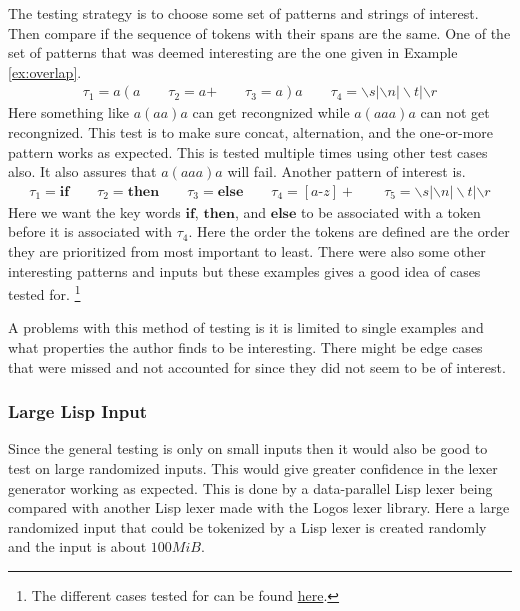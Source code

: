 \documentclass[a4paper,12pt]{article}
\theoremstyle{definition}
\begin{document}
The testing strategy is to choose some set of patterns and strings of interest. Then compare if the sequence of tokens with their spans are the same. One of the set of patterns that was deemed interesting are the one given in Example \ref{ex:overlap}.
\begin{align*}
  \tau_1 = a(a \qquad \tau_2 = a\text{+} \qquad \tau_3 = a)a \qquad \tau_4 = \backslash s|\backslash n |\backslash t | \backslash r
\end{align*}
Here something like $a(aa)a$ can get recongnized while $a(aaa)a$ can not get recongnized. This test is to make sure concat, alternation, and the one-or-more pattern works as expected. This is tested multiple times using other test cases also. It also assures that $a(aaa)a$ will fail. Another pattern of interest is.
\begin{align*}
  \tau_1 = \mathbf{if} \qquad \tau_2 = \mathbf{then} \qquad \tau_3 = \mathbf{else} \qquad \tau_4 = [a\text{-}z]+ \qquad \tau_5 = \backslash s|\backslash n |\backslash t | \backslash r
\end{align*}
Here we want the key words $\mathbf{if}$, $\mathbf{then}$, and $\mathbf{else}$ to be associated with a token before it is associated with $\tau_4$. Here the order the tokens are defined are the order they are prioritized from most important to least. There were also some other interesting patterns and inputs but these examples gives a good idea of cases tested for. \footnote{The different cases tested for can be found \href{https://github.com/diku-dk/alpacc/tree/20b98004bb18bfd7d8031ffaf053f382f821889a/futhark-tests/lexer-tests}{here}.}

A problems with this method of testing is it is limited to single examples and what properties the author finds to be interesting. There might be edge cases that were missed and not accounted for since they did not seem to be of interest.
\subsubsection{Large Lisp Input}
Since the general testing is only on small inputs then it would also be good to test on large randomized inputs. This would give greater confidence in the lexer generator working as expected. This is done by a data-parallel Lisp lexer being compared with another Lisp lexer made with the Logos lexer library. Here a large randomized input that could be tokenized by a Lisp lexer is created randomly and the input is about $100MiB$.
\end{document}
